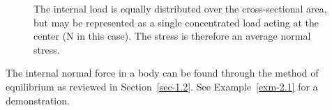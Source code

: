 \documentclass[
  letterpaper,
  DIV=11,
  numbers=noendperiod]{scrreprt}
\theoremstyle{definition}
\theoremstyle{remark}
\begin{document}
\begin{figure}


\caption{\label{fig-2.2}The internal load is equally distributed over
the cross-sectional area, but may be represented as a single
concentrated load acting at the center (N in this case). The stress is
therefore an average normal stress.}

\end{figure}%

The internal normal force in a body can be found through the method of
equilibrium as reviewed in Section~\ref{sec-1.2}. See
Example~\ref{exm-2.1} for a demonstration.
\end{document}

